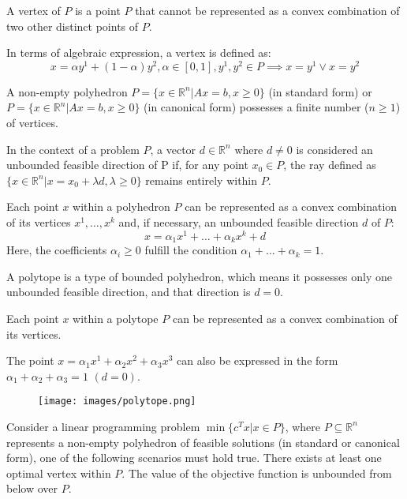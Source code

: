 \begin{definition}
    A vertex of $P$ is a point $P$ that cannot be represented as a convex combination of two other distinct points of $P$. 
\end{definition}
In terms of algebraic expression, a vertex is defined as:
\[x= \alpha y^1+(1-\alpha)y^2, \alpha \in [0,1], y^1,y^2 \in P \implies x=y^1 \lor x=y^2\]
\begin{property}
    A non-empty polyhedron $P=\{x \in \mathbb{R}^n|Ax=b,x \geq 0\}$ (in standard form) or $P=\{x \in \mathbb{R}^n|Ax=b,x \geq 0\}$ (in canonical form) possesses a finite number ($n \geq 1$) of vertices. 
\end{property}
\begin{definition}
    In the context of a problem $P$, a vector $d \in \mathbb{R}^n$ where $d \neq 0$ is considered an unbounded feasible direction of P if, for any  point $x_0 \in P$, the ray defined as $\{x \in \mathbb{R}^n|x=x_0+\lambda d,\lambda \geq 0\}$ remains entirely within $P$.
\end{definition}
\begin{theorem}
    Each point $x$ within a polyhedron $P$ can be represented as a convex combination of its vertices $x^1,\dots,x^k$ and, if necessary, an unbounded feasible direction $d$ of $P$: 
    \[x=\alpha_1x^1+\dots+\alpha_kx^k+d\]
    Here, the coefficients $\alpha_i \geq 0$ fulfill the condition $\alpha_1+\dots+\alpha_k=1$. 
\end{theorem}
\begin{definition}
    A polytope is a type of bounded polyhedron, which means it possesses only one unbounded feasible direction, and that direction is $d=0$. 
\end{definition}
Each point $x$ within a polytope $P$ can be represented as a convex combination of its vertices.
\begin{example}
    The point $x=\alpha_1x^1+\alpha_2x^2+\alpha_3x^3$ can also be expressed in the form $\alpha_1+\alpha_2+\alpha_3=1$ $(d=0)$. 
    \begin{figure}[H]
        \centering
        \texttt{[image: images/polytope.png]}
    \end{figure}
\end{example}
\begin{theorem}
    Consider a linear programming problem $\min\{c^Tx|x \in P\}$, where $P \subseteq \mathbb{R}^n$ represents a non-empty polyhedron of feasible solutions (in standard or canonical form), one of the following scenarios must hold true.
    There exists at least one optimal vertex within $P$.
    The value of the objective function is unbounded from below over $P$.
\end{theorem}
